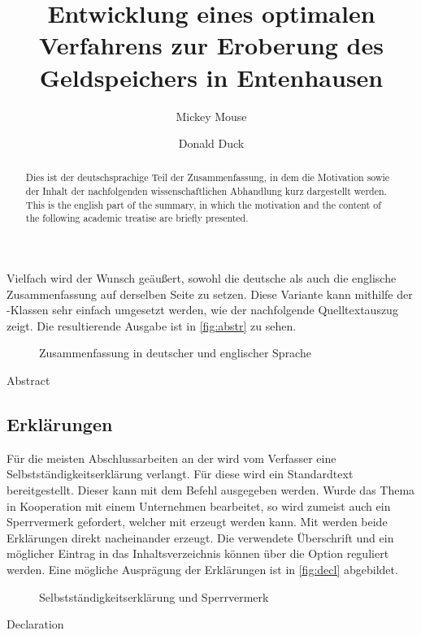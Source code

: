 \documentclass[english,ngerman]{tudscrartcl}
\begin{document}
Vielfach wird der Wunsch geäußert, sowohl die deutsche als auch die englische 
Zusammenfassung auf derselben Seite zu setzen. Diese Variante kann mithilfe 
der \TUDScript-Klassen sehr einfach umgesetzt werden, wie der nachfolgende 
Quelltextauszug zeigt. Die resultierende Ausgabe ist in \autoref{fig:abstr} zu 
sehen.
\begin{figure}
\centering
{}
\caption{Zusammenfassung in deutscher und englischer Sprache}
\label{fig:abstr}
\end{figure}
\begin{Tutorial!}{Abstract}
\begin{abstract}
  Dies ist der deutschsprachige Teil der Zusammenfassung, in dem die
  Motivation sowie der Inhalt der nachfolgenden wissenschaftlichen
  Abhandlung kurz dargestellt werden.
\nextabstract[english]
  This is the english part of the summary, in which the motivation and
  the content of the following academic treatise are briefly presented.
\end{abstract}
\end{Tutorial!}


\subsection{Erklärungen}
Für die meisten Abschlussarbeiten an der \TnUD wird vom Verfasser eine 
Selbstständigkeitserklärung verlangt. Für diese wird ein Standardtext 
bereitgestellt. Dieser kann mit dem Befehl  ausgegeben 
werden. Wurde das Thema in Kooperation mit einem Unternehmen bearbeitet, so 
wird zumeist auch ein Sperrvermerk gefordert, welcher mit  
erzeugt werden kann. Mit  werden beide Erklärungen direkt 
nacheinander erzeugt. Die verwendete Überschrift und ein möglicher Eintrag in 
das Inhaltsverzeichnis können über die Option  reguliert 
werden. Eine mögliche Ausprägung der Erklärungen ist in \autoref{fig:decl} 
abgebildet.
\begin{figure}
\centering
{}
\caption{Selbstständigkeitserklärung und Sperrvermerk}
\label{fig:decl}
\end{figure}
\begin{Tutorial!}{Declaration}
\title{%
  Entwicklung eines optimalen Verfahrens zur Eroberung des
  Geldspeichers in Entenhausen
}
\author{Mickey Mouse\and Donald Duck}
\declaration[company=FIRMA]
\end{Tutorial!}
\end{document}
